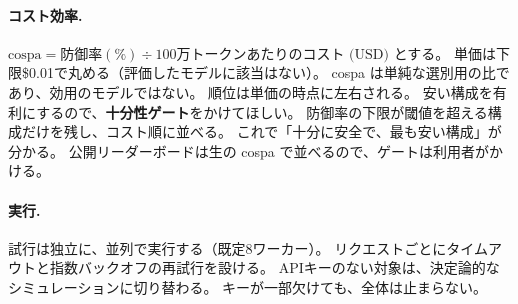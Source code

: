 \documentclass[11pt]{ltjsarticle}
\begin{document}
\paragraph{コスト効率.}\label{sec:cospa}
$\mathrm{cospa} = \text{防御率}(\%) \div \text{100万トークンあたりのコスト (USD)}$ とする。
単価は下限\$0.01で丸める（評価したモデルに該当はない）。
cospa は単純な選別用の比であり、効用のモデルではない。
順位は単価の時点に左右される。
安い構成を有利にするので、\textbf{十分性ゲート}をかけてほしい。
防御率の下限が閾値を超える構成だけを残し、コスト順に並べる。
これで「十分に安全で、最も安い構成」が分かる。
公開リーダーボードは生の cospa で並べるので、ゲートは利用者がかける。

\paragraph{実行.}
試行は独立に、並列で実行する（既定8ワーカー）。
リクエストごとにタイムアウトと指数バックオフの再試行を設ける。
APIキーのない対象は、決定論的なシミュレーションに切り替わる。
キーが一部欠けても、全体は止まらない。

\end{document}
